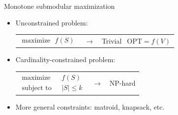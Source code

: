 \documentclass[xetex,10pt,mathserif]{beamer}
\begin{document}
\renewcommand{\tabularxcolumn}[1]{>{\small}m{#1}}
\begin{frame}{Monotone submodular maximization}
\begin{itemize}
\item<1-> Unconstrained problem:\\
\begin{tabularx}{3in}{XcX}
{\begin{align*}\textrm{maximize}\ \ \ f(S)\end{align*}} & $\longrightarrow$ & {\color{green!50!darkgray}Trivial} $\ \ \textrm{OPT} = f(V)$
\end{tabularx}
\vspace{1em}
\item<2-> Cardinality-constrained problem:\\
\begin{tabularx}{3in}{XcX}
{\begin{align*}\textrm{maximize}\ \ \ &f(S)\\ \textrm{subject to}\ \ \ &|S| \leq k\end{align*}} & $\longrightarrow$ & \color{red!80!darkgray} NP-hard
\end{tabularx}
\vspace{1em}
\item<3-> More general constraints: matroid, knapsack, etc.
\end{itemize}
\end{frame}
\end{document}
